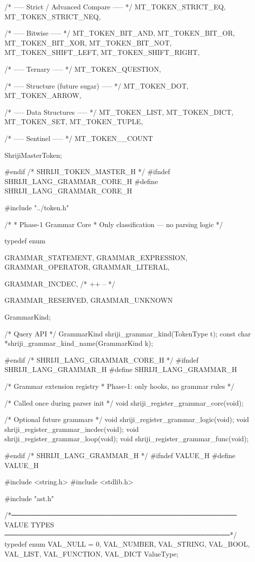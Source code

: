 \documentclass{article}
\begin{document}
{    /* ----- Strict / Advanced Compare ----- */
    MT_TOKEN_STRICT_EQ,
    MT_TOKEN_STRICT_NEQ,

    /* ----- Bitwise ----- */
    MT_TOKEN_BIT_AND,
    MT_TOKEN_BIT_OR,
    MT_TOKEN_BIT_XOR,
    MT_TOKEN_BIT_NOT,
    MT_TOKEN_SHIFT_LEFT,
    MT_TOKEN_SHIFT_RIGHT,

    /* ----- Ternary ----- */
    MT_TOKEN_QUESTION,

    /* ----- Structure (future sugar) ----- */
    MT_TOKEN_DOT,
    MT_TOKEN_ARROW,

    /* ----- Data Structures ----- */
    MT_TOKEN_LIST,
    MT_TOKEN_DICT,
    MT_TOKEN_SET,
    MT_TOKEN_TUPLE,

    /* ----- Sentinel ----- */
    MT_TOKEN__COUNT

} ShrijiMasterToken;

#endif /* SHRIJI_TOKEN_MASTER_H */
#ifndef SHRIJI_LANG_GRAMMAR_CORE_H
#define SHRIJI_LANG_GRAMMAR_CORE_H

#include "../token.h"

/*
 * Phase-1 Grammar Core
 * Only classification — no parsing logic
 */

typedef enum {
    GRAMMAR_STATEMENT,
    GRAMMAR_EXPRESSION,
    GRAMMAR_OPERATOR,
    GRAMMAR_LITERAL,

    GRAMMAR_INCDEC,     /* ++ -- */

    GRAMMAR_RESERVED,
    GRAMMAR_UNKNOWN
} GrammarKind;

/* Query API */
GrammarKind shriji_grammar_kind(TokenType t);
const char *shriji_grammar_kind_name(GrammarKind k);

#endif /* SHRIJI_LANG_GRAMMAR_CORE_H */
#ifndef SHRIJI_LANG_GRAMMAR_H
#define SHRIJI_LANG_GRAMMAR_H

/* Grammar extension registry
 * Phase-1: only hooks, no grammar rules
 */

/* Called once during parser init */
void shriji_register_grammar_core(void);

/* Optional future grammars */
void shriji_register_grammar_logic(void);
void shriji_register_grammar_incdec(void);
void shriji_register_grammar_loop(void);
void shriji_register_grammar_func(void);

#endif /* SHRIJI_LANG_GRAMMAR_H */
#ifndef VALUE_H
#define VALUE_H

#include <string.h>
#include <stdlib.h>

#include "ast.h"

/*──────────────────────────────────────────────
  VALUE TYPES
──────────────────────────────────────────────*/
typedef enum {
    VAL_NULL = 0,
    VAL_NUMBER,
    VAL_STRING,
    VAL_BOOL,
    VAL_LIST,
    VAL_FUNCTION,
    VAL_DICT
} ValueType;
\end{document}
